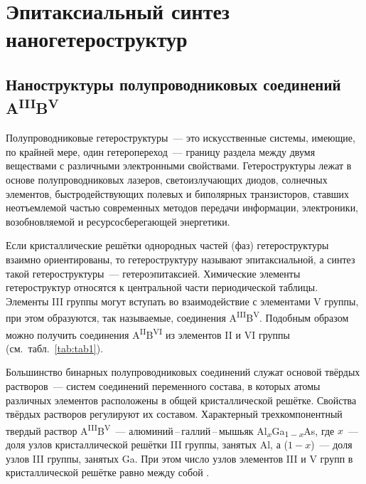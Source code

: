 \chapter{Эпитаксиальный синтез наногетероструктур}\label{ch:ch1}

\section{Наноструктуры полупроводниковых соединений
A\textsuperscript{III}B\textsuperscript{V}}\label{sec:ch1/sec1}

Полупроводниковые гетероструктуры~--- это искусственные системы, имеющие, по
крайней мере, один гетеропереход~--- границу раздела между двумя веществами с
различными электронными свойствами. Гетероструктуры лежат в основе
полупроводниковых лазеров, светоизлучающих диодов, солнечных элементов,
быстродействующих полевых и биполярных транзисторов, ставших неотъемлемой
частью современных методов передачи информации, электроники, возобновляемой и
ресурсосберегающей энергетики.

Если кристаллические решётки однородных частей (фаз) гетероструктуры взаимно
ориентированы, то гетероструктуру называют эпитаксиальной, а синтез такой
гетероструктуры~--- гетероэпитаксией. Химические элементы гетероструктур
относятся к центральной части периодической таблицы. Элементы III группы могут
вступать во взаимодействие с элементами V группы, при этом образуются, так
называемые, соединения A\textsuperscript{III}B\textsuperscript{V}. Подобным
образом можно получить соединения A\textsuperscript{II}B\textsuperscript{VI} из
элементов II и VI группы (см.~табл.~\cref{tab:tab1}).

Большинство бинарных полупроводниковых соединений служат основой твёрдых
растворов~--- систем соединений переменного состава, в которых атомы различных
элементов расположены в общей кристаллической решётке. Свойства твёрдых
растворов регулируют их составом. Характерный трехкомпонентный твердый раствор
A\textsuperscript{III}B\textsuperscript{V}~--- алюминий\,--\,галлий\,--\,мышьяк
Al\textsubscript{\(x\)}Ga\textsubscript{\(1 - x\)}As, где \(x\)~--- доля узлов
кристаллической решётки III группы, занятых Al, а (\(1 - x\))~--- доля узлов
III группы, занятых Ga. При этом число узлов элементов III и V групп в
кристаллической решётке равно между собой \cite{Kroemer2001}.

